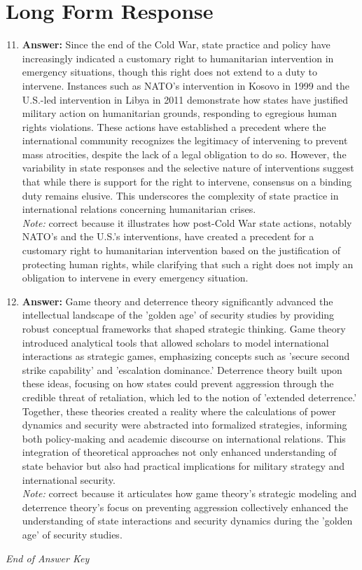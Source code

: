 \documentclass[12pt]{article}
\begin{document}
\section*{Long Form Response}
\begin{enumerate}[label=\arabic*.]
\setcounter{enumi}{10}
\item \textbf{Answer:} Since the end of the Cold War, state practice and policy have increasingly indicated a customary right to humanitarian intervention in emergency situations, though this right does not extend to a duty to intervene. Instances such as NATO's intervention in Kosovo in 1999 and the U.S.-led intervention in Libya in 2011 demonstrate how states have justified military action on humanitarian grounds, responding to egregious human rights violations. These actions have established a precedent where the international community recognizes the legitimacy of intervening to prevent mass atrocities, despite the lack of a legal obligation to do so. However, the variability in state responses and the selective nature of interventions suggest that while there is support for the right to intervene, consensus on a binding duty remains elusive. This underscores the complexity of state practice in international relations concerning humanitarian crises.
\\ \textit{Note:} correct because it illustrates how post-Cold War state actions, notably NATO's and the U.S.'s interventions, have created a precedent for a customary right to humanitarian intervention based on the justification of protecting human rights, while clarifying that such a right does not imply an obligation to intervene in every emergency situation.
\item \textbf{Answer:} Game theory and deterrence theory significantly advanced the intellectual landscape of the 'golden age' of security studies by providing robust conceptual frameworks that shaped strategic thinking. Game theory introduced analytical tools that allowed scholars to model international interactions as strategic games, emphasizing concepts such as 'secure second strike capability' and 'escalation dominance.' Deterrence theory built upon these ideas, focusing on how states could prevent aggression through the credible threat of retaliation, which led to the notion of 'extended deterrence.' Together, these theories created a reality where the calculations of power dynamics and security were abstracted into formalized strategies, informing both policy-making and academic discourse on international relations. This integration of theoretical approaches not only enhanced understanding of state behavior but also had practical implications for military strategy and international security.
\\ \textit{Note:} correct because it articulates how game theory's strategic modeling and deterrence theory's focus on preventing aggression collectively enhanced the understanding of state interactions and security dynamics during the 'golden age' of security studies.
\end{enumerate}

\vfill
\noindent\textit{End of Answer Key}
\end{document}
